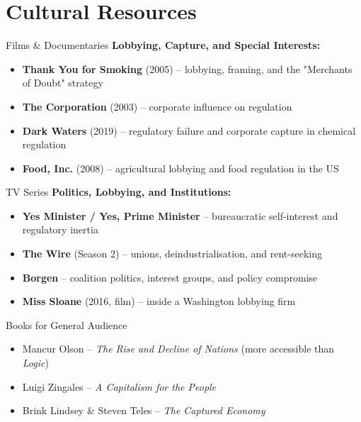 \documentclass[10pt]{beamer}
\begin{document}
\section*{Cultural Resources}

\begin{frame}{Films \& Documentaries}
\textbf{Lobbying, Capture, and Special Interests:}
\begin{itemize}
\item \textbf{Thank You for Smoking} (2005) -- lobbying, framing, and the "Merchants of Doubt" strategy
\item \textbf{The Corporation} (2003) -- corporate influence on regulation
\item \textbf{Dark Waters} (2019) -- regulatory failure and corporate capture in chemical regulation
\item \textbf{Food, Inc.} (2008) -- agricultural lobbying and food regulation in the US
\end{itemize}
\end{frame}


\begin{frame}{TV Series}
\textbf{Politics, Lobbying, and Institutions:}
\begin{itemize}
\item \textbf{Yes Minister / Yes, Prime Minister} -- bureaucratic self-interest and regulatory inertia
\item \textbf{The Wire} (Season 2) -- unions, deindustrialisation, and rent-seeking
\item \textbf{Borgen} -- coalition politics, interest groups, and policy compromise
\item \textbf{Miss Sloane} (2016, film) -- inside a Washington lobbying firm
\end{itemize}
\end{frame}


\begin{frame}{Books for General Audience}
\begin{itemize}
\item Mancur Olson -- \emph{The Rise and Decline of Nations} (more accessible than \emph{Logic})
\item Luigi Zingales -- \emph{A Capitalism for the People}
\item Brink Lindsey \& Steven Teles -- \emph{The Captured Economy}
\end{itemize}
\end{frame}
\end{document}
